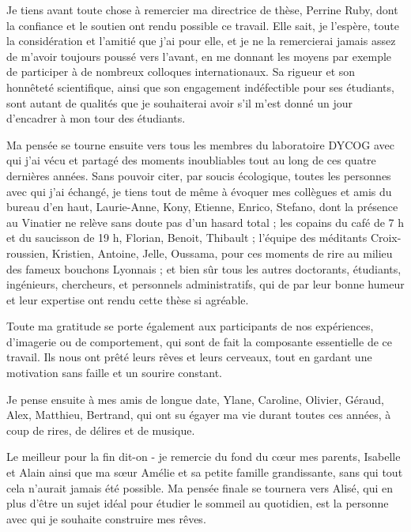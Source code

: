 \label{sec:acknowledgement}
\vspace*{-10mm}

Je tiens avant toute chose à remercier ma directrice de thèse, Perrine Ruby, dont la confiance et le soutien ont rendu possible ce travail. Elle sait, je l'espère, toute la considération et l'amitié que j'ai pour elle, et je ne la remercierai jamais assez de m'avoir toujours poussé vers l'avant, en me donnant les moyens par exemple de participer à de nombreux colloques internationaux. Sa rigueur et son honnêteté scientifique, ainsi que son engagement indéfectible pour ses étudiants, sont autant de qualités que je souhaiterai avoir s'il m'est donné un jour d'encadrer à mon tour des étudiants.

Ma pensée se tourne ensuite vers tous les membres du laboratoire DYCOG avec qui j’ai vécu et partagé des moments inoubliables tout au long de ces quatre dernières années. Sans pouvoir citer, par soucis écologique, toutes les personnes avec qui j’ai échangé, je tiens tout de même à évoquer mes collègues et amis du bureau d’en haut, Laurie-Anne, Kony, Etienne, Enrico, Stefano, dont la présence au Vinatier ne relève sans doute pas d’un hasard total ; les copains du café de 7 h et du saucisson de 19 h, Florian, Benoit, Thibault ; l’équipe des méditants Croix-roussien, Kristien, Antoine, Jelle, Oussama, pour ces moments de rire au milieu des fameux bouchons Lyonnais ; et bien sûr tous les autres doctorants, étudiants, ingénieurs, chercheurs, et personnels administratifs, qui de par leur bonne humeur et leur expertise ont rendu cette thèse si agréable.

Toute ma gratitude se porte également aux participants de nos expériences, d’imagerie ou de comportement, qui sont de fait la composante essentielle de ce travail. Ils nous ont prêté leurs rêves et leurs cerveaux, tout en gardant une motivation sans faille et un sourire constant.

Je pense ensuite à mes amis de longue date, Ylane, Caroline, Olivier, Géraud, Alex, Matthieu, Bertrand, qui ont su égayer ma vie durant toutes ces années, à coup de rires, de délires et de musique.

Le meilleur pour la fin dit-on - je remercie du fond du cœur mes parents, Isabelle et Alain ainsi que ma sœur Amélie et sa petite famille grandissante, sans qui tout cela n'aurait jamais été possible. Ma pensée finale se tournera vers Alisé, qui en plus d’être un sujet idéal pour étudier le sommeil au quotidien, est la personne avec qui je souhaite construire mes rêves.

